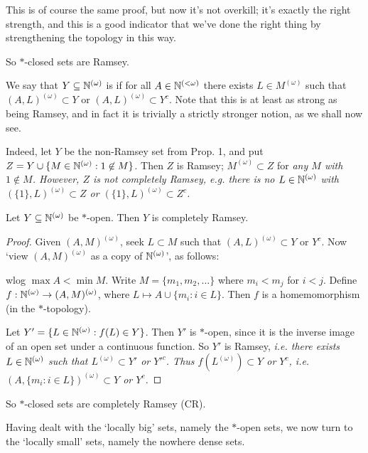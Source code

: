 \documentclass[10pt]{article}
\newcommand{\bom}{{(\omega)}}
\newcommand{\blom}{{(<\omega)}}
\begin{document}
This is of course the same proof, but now it's not overkill; it's exactly the right strength, and this is a good indicator that we've done the right thing by strengthening the topology in this way.

\begin{remark*}
    So $\ast$-closed sets are Ramsey.
\end{remark*}

We say that $Y\subset \N^\bom$ is  if for all $A \in \N^\blom$ there exists $L \in M^\bom$ such that $(A,L)^\bom\subset Y$ or $(A,L)^\bom \subset Y^c$. Note that this is at least as strong as being Ramsey, and in fact it is trivially a strictly stronger notion, as we shall now see.

Indeed, let $Y$ be the non-Ramsey set from Prop. 1, and put $Z = Y \cup \{M \in \N^\bom : 1 \not\in M\}$. Then $Z$ is Ramsey; $M^\bom \subset Z$ for \it{any} $M$ with $1\not\in M$. However, $Z$ is not completely Ramsey, \it{e.g.} there is no $L \in \N^\bom$ with $(\{1\},L)^\bom \subset Z$ or $(\{1\},L)^\bom \subset Z^c$.


\begin{theorem}
    Let $Y\subset \N^\bom$ be $\ast$-open. Then $Y$ is completely Ramsey.
\end{theorem}
\begin{proof}
    Given $(A,M)^\bom$, seek $L \subset M$ such that $(A,L)^\bom \subset Y$ or $Y^c$. Now `view $(A,M)^\bom$ as a copy of $\N^\bom$', as follows:

    wlog $\max A < \min M$. Write $M = \{m_1,m_2,\dots\}$ where $m_i < m_j$ for $i < j$. Define $f : \N^\bom \ra (A,M)^\bom$, where $L\mapsto A\cup \{m_i : i \in L\}$. Then $f$ is a homemomorphism (in the $\ast$-topology).

    Let $Y' = \{L \in \N^\bom : f(L) \in Y\}$. Then $Y'$ is $\ast$-open, since it is the inverse image of an open set under a continuous function. So $Y'$ is Ramsey, \it{i.e.} there exists $L \in \N^\bom$ such that $L^\bom \subset Y'$ or $Y'^c$. Thus $f(L^\bom)\subset Y$ or $Y^c$, \it{i.e.} $(A,\{m_i:i\in L\})^\bom \subset Y$ or $Y^c$.
\end{proof}

\begin{remark*}
    So $\ast$-closed sets are completely Ramsey (CR).
\end{remark*}

Having dealt with the `locally big' sets, namely the $\ast$-open sets, we now turn to the `locally small' sets, namely the nowhere dense sets.
\end{document}

